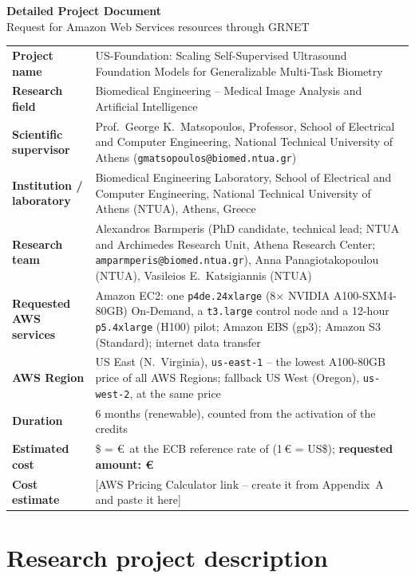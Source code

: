 \documentclass[11pt,a4paper]{article}
\renewcommand{\EUR}[1]{\euro\,#1}
\newcommand{\confirm}[1]{\textcolor{red!70!black}{[#1]}}
\newcommand{\CalcLink}{\confirm{AWS Pricing Calculator link -- create it from Appendix~A and paste it here}}
\begin{document}
\begin{center}
{\LARGE\bfseries Detailed Project Document}\\[3pt]
{\large Request for Amazon Web Services resources through GRNET}
\end{center}

\begin{tabularx}{\textwidth}{@{}>{\bfseries}p{3.9cm}X@{}}
\toprule
Project name & US-Foundation: Scaling Self-Supervised Ultrasound Foundation Models for Generalizable Multi-Task Biometry \\
Research field & Biomedical Engineering -- Medical Image Analysis and Artificial Intelligence \\
Scientific supervisor & Prof.\ George K.\ Matsopoulos, Professor, School of Electrical and Computer Engineering, National Technical University of Athens (\texttt{gmatsopoulos@biomed.ntua.gr}) \\
Institution / laboratory & Biomedical Engineering Laboratory, School of Electrical and Computer Engineering, National Technical University of Athens (NTUA), Athens, Greece \\
Research team & Alexandros Barmperis (PhD candidate, technical lead; NTUA and Archimedes Research Unit, Athena Research Center; \texttt{amparmperis@biomed.ntua.gr}), Anna Panagiotakopoulou (NTUA), Vasileios E.\ Katsigiannis (NTUA) \\
Requested AWS services & Amazon EC2: one \texttt{p4de.24xlarge} (8$\times$ NVIDIA A100-SXM4-80GB) On-Demand, a \texttt{t3.large} control node and a 12-hour \texttt{p5.4xlarge} (H100) pilot; Amazon EBS (gp3); Amazon S3 (Standard); internet data transfer \\
AWS Region & US East (N.~Virginia), \texttt{us-east-1} -- the lowest A100-80GB price of all AWS Regions; fallback US West (Oregon), \texttt{us-west-2}, at the same price \\
Duration & 6 months (renewable), counted from the activation of the credits \\
Estimated cost & \$\TotalUSD{} = \EUR{\TotalEUR} at the ECB reference rate of \FXdate{} (1\,\euro{} = \FX{} US\$); \textbf{requested amount: \EUR{\RequestEUR}} \\
Cost estimate & \CalcLink \\
\bottomrule
\end{tabularx}

\section{Research project description}
\end{document}
